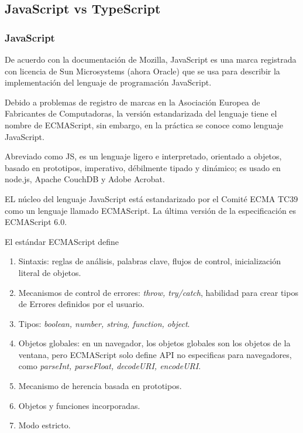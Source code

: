 \subsection{JavaScript vs TypeScript}

\subsubsection*{JavaScript}
De acuerdo con la documentación de Mozilla\cite{noauthor_javascript_nodate}, JavaScript es una marca registrada con licencia de Sun Microsystems (ahora Oracle) que se usa para describir la implementación del lenguaje de programación JavaScript.


Debido a problemas de registro de marcas en la Asociación Europea de Fabricantes de Computadoras, la versión estandarizada del lenguaje tiene el nombre de ECMAScript, sin embargo, en la práctica se conoce como lenguaje JavaScript. 


Abreviado como JS, es un lenguaje ligero e interpretado, orientado a objetos, basado en prototipos, imperativo, débilmente tipado y dinámico; es usado en node.js, Apache CouchDB y Adobe Acrobat.


EL núcleo del lenguaje JavaScript está estandarizado por el Comité ECMA TC39 como un lenguaje llamado ECMAScript. La última versión de la especificación es ECMAScript 6.0.


El estándar ECMAScript define 

\begin{enumerate}
    \item Sintaxis: reglas de análisis, palabras clave, flujos de control, inicialización literal de objetos.
    \item Mecanismos de control de errores: \textit{throw, try/catch}, habilidad para crear tipos de Errores definidos por el usuario.
    \item Tipos: \textit{boolean, number, string, function, object}.
    \item  Objetos globales: en un navegador, los objetos globales son los objetos de la ventana, pero ECMAScript solo define API no especificas para navegadores, como \textit{parseInt, parseFloat, decodeURI, encodeURI}.
    \item Mecanismo de herencia basada en prototipos.
    \item Objetos y funciones incorporadas.
    \item Modo estricto.
\end{enumerate}

